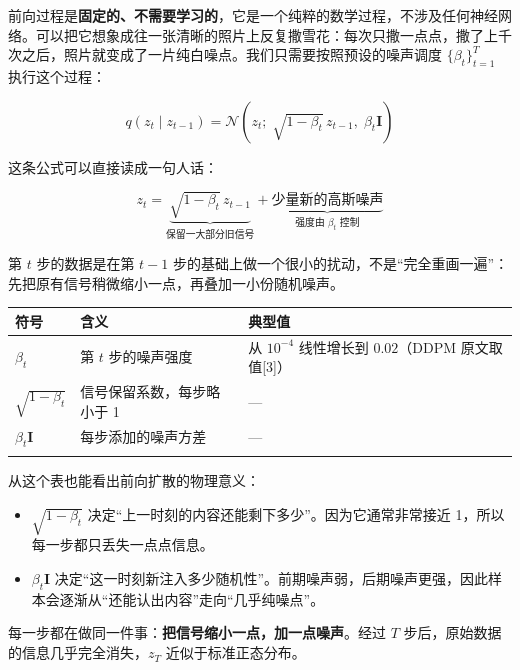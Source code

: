 \documentclass[
  chinese,
]{ctexart}
\providecommand{\tightlist}{%
  \setlength{\itemsep}{0pt}\setlength{\parskip}{0pt}}
\begin{document}
前向过程是\textbf{固定的、不需要学习的}，它是一个纯粹的数学过程，不涉及任何神经网络。可以把它想象成往一张清晰的照片上反复撒雪花：每次只撒一点点，撒了上千次之后，照片就变成了一片纯白噪点。我们只需要按照预设的噪声调度
\(\{\beta_t\}_{t=1}^T\) 执行这个过程：

\[
q(z_t \mid z_{t-1}) = \mathcal{N}\!\left(z_t;\; \sqrt{1 - \beta_t}\, z_{t-1},\; \beta_t \mathbf{I}\right)
\]

这条公式可以直接读成一句人话：

\[
z_t = \underbrace{\sqrt{1-\beta_t}\, z_{t-1}}_{\text{保留一大部分旧信号}} + \underbrace{\text{少量新的高斯噪声}}_{\text{强度由 } \beta_t \text{ 控制}}
\]

第 \(t\) 步的数据是在第 \(t-1\)
步的基础上做一个很小的扰动，不是``完全重画一遍''：先把原有信号稍微缩小一点，再叠加一小份随机噪声。

\begin{center}
\begin{tabular}{@{}>{\raggedright\arraybackslash}p{} >{\raggedright\arraybackslash}p{} >{\raggedright\arraybackslash}p{}@{}}
\toprule\noalign{}
符号 & 含义 & 典型值 \\
\midrule\noalign{}
\(\beta_t\) & 第 \(t\) 步的噪声强度 & 从 \(10^{-4}\) 线性增长到 \(0.02\)（DDPM 原文取值{[}3{]}） \\
\(\sqrt{1-\beta_t}\) & 信号保留系数，每步略小于 1 & --- \\
\(\beta_t \mathbf{I}\) & 每步添加的噪声方差 & --- \\
\bottomrule\noalign{}
\end{tabular}
\end{center}

从这个表也能看出前向扩散的物理意义：

\begin{itemize}
\tightlist
\item
  \(\sqrt{1-\beta_t}\)
  决定``上一时刻的内容还能剩下多少''。因为它通常非常接近
  1，所以每一步都只丢失一点点信息。
\item
  \(\beta_t \mathbf{I}\)
  决定``这一时刻新注入多少随机性''。前期噪声弱，后期噪声更强，因此样本会逐渐从``还能认出内容''走向``几乎纯噪点''。
\end{itemize}

每一步都在做同一件事：\textbf{把信号缩小一点，加一点噪声}。经过 \(T\)
步后，原始数据的信息几乎完全消失，\(z_T\) 近似于标准正态分布。
\end{document}
